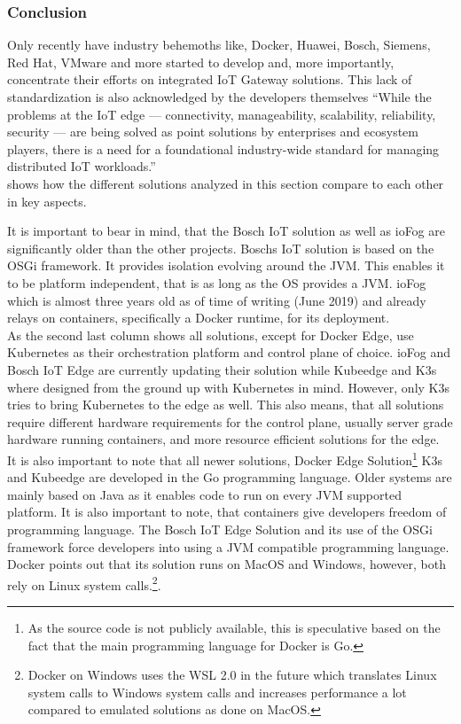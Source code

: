 \subsubsection{Conclusion}
Only recently have industry behemoths like, Docker, Huawei, Bosch, Siemens, Red Hat, VMware and more\cite{K8sattheEdgeContectOnWorkingGroup:online} started to develop and, more importantly, concentrate their efforts on integrated IoT Gateway solutions. This lack of standardization is also acknowledged by the developers themselves ``While the problems at the IoT edge — connectivity, manageability, scalability, reliability, security — are being solved as point solutions by enterprises and ecosystem players, there is a need for a foundational industry-wide standard for managing distributed IoT workloads.''\cite{ioFogK8sBlog:online}\\
 shows how the different solutions analyzed in this section compare to each other in key aspects.

It is important to bear in mind, that the Bosch IoT solution as well as ioFog are significantly older than the other projects. Boschs IoT solution is based on the OSGi framework. It provides isolation evolving around the JVM. This enables it to be platform independent, that is as long as the OS provides a JVM. ioFog which is almost three years old as of time of writing (June 2019) and already relays on containers, specifically a Docker runtime, for its deployment.\\
As the second last column shows all solutions, except for Docker Edge, use Kubernetes as their orchestration platform and control plane of choice. ioFog and Bosch IoT Edge are currently updating their solution while Kubeedge and K3s where designed from the ground up with Kubernetes in mind. However, only K3s tries to bring Kubernetes to the edge as well. This also means, that all solutions require different hardware requirements for the control plane, usually server grade hardware running containers, and more resource efficient solutions for the edge. \\
It is also important to note that all newer solutions, Docker Edge Solution\footnote{As the source code is not publicly available, this is speculative based on the fact that the main programming language for Docker is Go.} K3s and Kubeedge are developed in the Go programming language. Older systems are mainly based on Java as it enables code to run on every JVM supported platform. It is also important to note, that containers give developers freedom of programming language. The Bosch IoT Edge Solution and its use of the OSGi framework force developers into using a JVM compatible programming language. Docker points out that its solution runs on MacOS and Windows, however, both rely on Linux system calls.\footnote{Docker on Windows uses the WSL 2.0 in the future which translates Linux system calls to Windows system calls and increases performance a lot compared to emulated solutions as done on MacOS.}.\\
